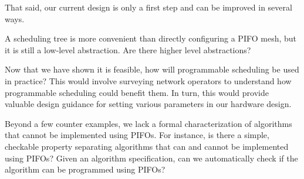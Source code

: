 That said, our current design is only a first step and can be improved in
several ways.
\begin{CompactEnumerate}
\item A scheduling tree is more convenient than directly configuring a
PIFO mesh, but it is still a low-level abstraction. Are there higher
level abstractions?
\item Now that we have shown it is feasible, how will programmable scheduling
be used in practice? This would involve surveying network operators to
understand how programmable scheduling could benefit them. In turn, this would
provide valuable design guidance for setting various parameters in our hardware design.
\item Beyond a few counter examples, we lack a formal characterization of
algorithms that cannot be implemented using PIFOs. For instance, is there a
simple, checkable property separating algorithms that can and cannot be
implemented using PIFOs? Given an algorithm specification, can we
automatically check if the algorithm can be programmed
using PIFOs?
\item {}
\end{CompactEnumerate}
